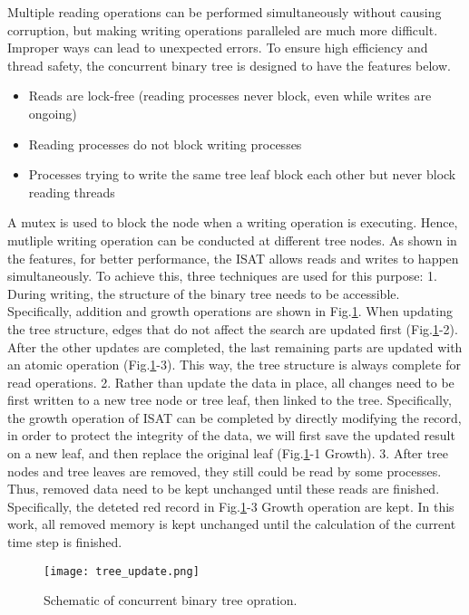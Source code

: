 Multiple reading operations can be performed simultaneously without causing corruption, but making writing operations paralleled are much more difficult. Improper ways can lead to unexpected errors. To ensure high efficiency and thread safety, the concurrent binary tree is designed to have the features below.

\begin{itemize}
    \item Reads are lock-free (reading processes never block, even while writes are ongoing)
    \item Reading processes do not block writing processes
    \item Processes trying to write the same tree leaf block each other but never block reading threads
\end{itemize}


A mutex is used to block the node when a writing operation is executing. Hence, mutliple writing operation can be conducted at different tree nodes. As shown in the features, for better performance, the ISAT allows reads and writes to happen simultaneously. To achieve this, three techniques are used for this purpose: 1. During writing, the structure of the binary tree needs to be accessible. Specifically, addition and growth operations are shown in Fig.\ref{MPI_op}. When updating the tree structure, edges that do not affect the search are updated first (Fig.\ref{MPI_op}-2). After the other updates are completed, the last remaining parts are updated with an atomic operation (Fig.\ref{MPI_op}-3). This way, the tree structure is always complete for read operations.
2. Rather than update the data in place, all changes need to be first written to a new tree node or tree leaf, then linked to the tree. Specifically, the growth operation of ISAT can be completed by directly modifying the record, in order to protect the integrity of the data, we will first save the updated result on a new leaf, and then replace the original leaf (Fig.\ref{MPI_op}-1 Growth).
3. After tree nodes and tree leaves are removed, they still could be read by some processes. Thus, removed data need to be kept unchanged until these reads are finished. Specifically, the deteted red record in Fig.\ref{MPI_op}-3 Growth operation are kept. In this work, all removed memory is kept unchanged until the calculation of the current time step is finished.

\begin{figure}[htbp]
    \centering
\texttt{[image: tree\_update.png]} 
\caption{Schematic of concurrent binary tree opration. }
\label{MPI_op} 
\end{figure}



